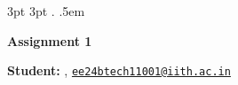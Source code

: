 


\usepackage{circuitikz}
\usepackage{float}
\usepackage{esint}
\usepackage{graphicx}
  {3pt}   
  {3pt}   
  {\itshape}  
  {}  
  {\bfseries}  
  {.}  
  {.5em}  
  {}  
\theoremstyle{observationstyle}
\newtheorem{observation}{Observation}
\newcommand{\uvec}[1]{\boldsymbol{\hat{\textbf{#1}}}}


\begin{Large}
    \textsf{\textbf{Assignment 1}}
\end{Large}

\vspace{1ex}

\textsf{\textbf{Student:}} , \href{mailto:ee24btech11001@iith.ac.in}{\texttt{ee24btech11001@iith.ac.in}}\\

\vspace{2ex}


